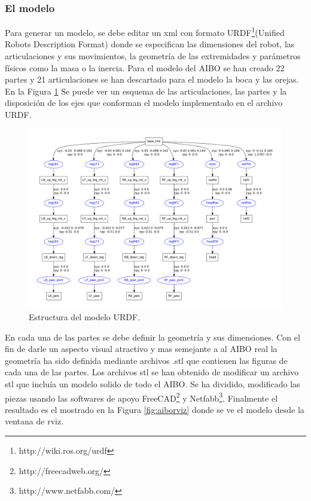 \documentclass[12pt,a4paper,final,twoside]{article}
\begin{document}
\subsubsection{El modelo}
Para generar un modelo, se debe editar un xml con formato URDF\footnote{http://wiki.ros.org/urdf}(Unified Robots Description Format) donde se especifican las dimensiones del robot, las articulaciones y sus movimientos, la geometría de las extremidades y parámetros físicos como la masa o la inercia.
Para el modelo del AIBO se han creado 22 partes y 21 articulaciones se han descartado para el modelo la boca y las orejas. En la Figura \ref{fig:aibourdf} Se puede ver un esquema de las articulaciones, las partes y la disposición de los ejes que conforman el modelo implementado en el archivo URDF.


\begin{figure}[H]
	\centering
    \includegraphics[scale=0.39]{images/Aibo.pdf}
	 \caption{Estructura del modelo URDF.}
  \label{fig:aibourdf}
\end{figure}

En  cada una de las partes se debe definir la geometría y sus dimensiones. Con el fin de darle un aspecto visual atractivo y mas semejante a al AIBO real la geometría ha sido  definida mediante archivos .stl que contienen las figuras de cada una de las partes. Los archivos stl se han obtenido de modificar un archivo stl que incluía un modelo solido de todo el AIBO. Se ha dividido, modificado las piezas usando las softwares de apoyo FreeCAD\footnote{http://freecadweb.org/} y Netfabb\footnote{http://www.netfabb.com/}. Finalmente el resultado es el mostrado en la Figura \ref{fig:aiborviz} donde se ve el modelo desde la ventana de rviz.
 
\end{document}
